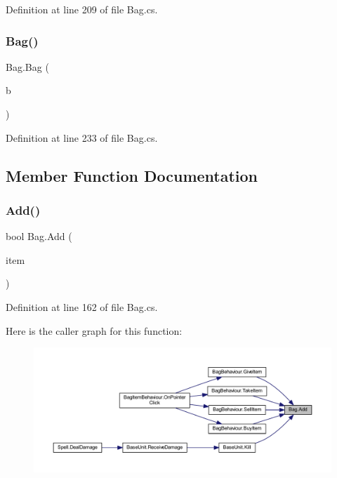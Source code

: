 Definition at line 209 of file Bag.\+cs.

\mbox{\label{class_bag_a8d6e5dcefb12fc099b2b02347e5dacae}} 
\subsubsection{\texorpdfstring{Bag()}{Bag()}\hspace{0.1cm}{\footnotesize\ttfamily [2/2]}}
{\footnotesize\ttfamily Bag.\+Bag (\begin{DoxyParamCaption}\item[{\mbox{\hyperlink{class_bag_a5a827c44705d57202edc93b9a39316c7}{Bag\+Type}}}]{b }\end{DoxyParamCaption})}



Definition at line 233 of file Bag.\+cs.



\subsection{Member Function Documentation}
\mbox{\label{class_bag_a4efd17483fce361ea8a01dcda349b3b4}} 
\subsubsection{\texorpdfstring{Add()}{Add()}}
{\footnotesize\ttfamily bool Bag.\+Add (\begin{DoxyParamCaption}\item[{\mbox{\hyperlink{class_base_item}{Base\+Item}}}]{item }\end{DoxyParamCaption})}



Definition at line 162 of file Bag.\+cs.

Here is the caller graph for this function\+:
\nopagebreak
\begin{figure}[H]
\begin{center}
\leavevmode
\includegraphics[width=350pt]{class_bag_a4efd17483fce361ea8a01dcda349b3b4_icgraph}
\end{center}
\end{figure}
\mbox{\label{class_bag_a85aa679243be4a24a6278d5f68c2ed5e}} 
